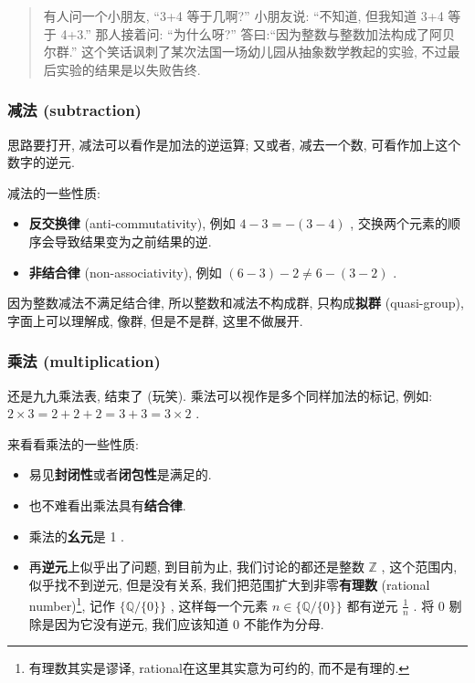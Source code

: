 \begin{quote}
有人问一个小朋友, ``3+4 等于几啊?'' 小朋友说: ``不知道, 但我知道 3+4
等于 4+3.'' 那人接着问: ``为什么呀?''
答曰:``因为整数与整数加法构成了阿贝尔群.''
这个笑话讽刺了某次法国一场幼儿园从抽象数学教起的实验,
不过最后实验的结果是以失败告终.
\end{quote}

\hypertarget{ux51cfux6cd5-subtraction}{%
\subsubsection{减法 (subtraction)}\label{ux51cfux6cd5-subtraction}}

思路要打开, 减法可以看作是加法的逆运算; 又或者, 减去一个数,
可看作加上这个数字的逆元.

减法的一些性质:

\begin{itemize}
\tightlist
\item
  \textbf{反交换律} (anti-commutativity), 例如 \(4−3=−(3−4)\) ,
  交换两个元素的顺序会导致结果变为之前结果的逆.
\item
  \textbf{非结合律} (non-associativity), 例如 \((6−3)−2\neq 6−(3−2)\) .
\end{itemize}

因为整数减法不满足结合律, 所以整数和减法不构成群, 只构成\textbf{拟群}
(quasi-group), 字面上可以理解成, 像群, 但是不是群, 这里不做展开.

\hypertarget{ux4e58ux6cd5-multiplication}{%
\subsubsection{乘法
(multiplication)}\label{ux4e58ux6cd5-multiplication}}

还是九九乘法表, 结束了 (玩笑). 乘法可以视作是多个同样加法的标记, 例如:
\(2×3=2+2+2=3+3=3×2\) .

来看看乘法的一些性质:

\begin{itemize}
\tightlist
\item
  易见\textbf{封闭性}或者\textbf{闭包性}是满足的.
\item
  也不难看出乘法具有\textbf{结合律}.
\item
  乘法的\textbf{幺元}是 1 .
\item
  再\textbf{逆元}上似乎出了问题, 到目前为止, 我们讨论的都还是整数
  \(\mathbb{Z}\) , 这个范围内, 似乎找不到逆元, 但是没有关系,
  我们把范围扩大到非零\textbf{有理数} (rational number)\footnote{有理数其实是谬译,
    rational在这里其实意为可约的, 而不是有理的.}, 记作
  \(\{\mathbb{Q}/\{0\}\}\) , 这样每一个元素 \(n\in\{\mathbb{Q}/\{0\}\}\)
  都有逆元 \(\frac{1}{n}\) . 将 \(0\) 剔除是因为它没有逆元, 我们应该知道
  0 不能作为分母.
\end{itemize}

